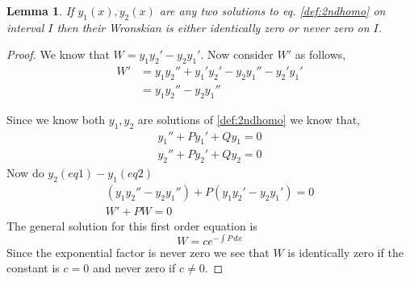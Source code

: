 \documentclass[oneside,11pt,pdftex,final]{book}%
\numberwithin{equation}{section}
\newtheorem{lemma}[theorem]{Lemma}
\newtheorem{example}[theorem]{Example}
\numberwithin{section}{chapter}
\numberwithin{equation}{chapter}
\begin{document}
\begin{lemma}
	If $ y_1(x) , y_2(x)$ are any two solutions to eq. \ref{def:2ndhomo} on interval $ I $ then their Wronskian is either identically zero or never zero on $ I $.
 \end{lemma}
\begin{proof}
	We know that $ W= y_1y_2'-y_2y_1'$. Now consider $ W' $ as follows,
	\begin{align*}
		W'&=y_1y_2''+y_1'y_2'-y_2y_1''-y_2'y_1'\\
		&=y_1y_2''-y_2y_1''
	\end{align*}

	Since we know both $ y_1,y_2 $ are solutions of \ref{def:2ndhomo} we know that,
	\begin{align*}
		y_1''+Py_1'+Qy_1=0\\
		y_2''+Py_2'+Qy_2=0
	\end{align*}
	Now do $ y_2(eq1)-y_1(eq2) $
	\begin{align*}
		(y_1y_2''-y_2y_1'')+P(y_1y_2'-y_2y_1')=0\\
		W'+PW=0
	\end{align*}
	The general solution for this first order equation is \[ W=ce^{-\int P\, dx} \]
	Since the exponential factor is never zero we see that $ W $ is identically zero if the constant is $ c=0 $ and never zero if $ c\neq 0 $.
\end{proof}
%
%
\end{document}

